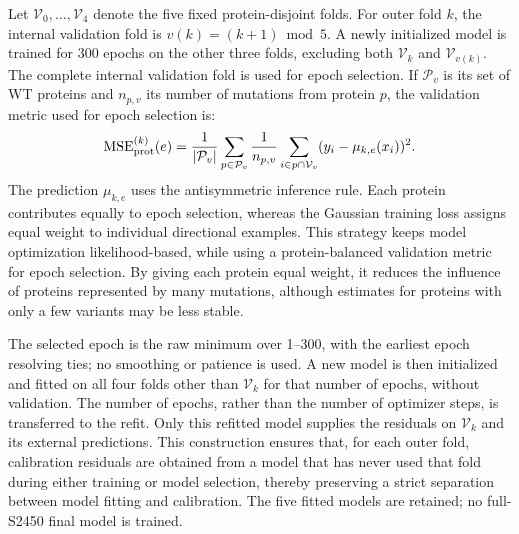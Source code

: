 \documentclass[11pt]{article}
\begin{document}
Let $\mathcal V_0,\ldots,\mathcal V_4$ denote the five fixed protein-disjoint folds.
For outer fold $k$, the internal validation fold is \begin{math}
    v(k)=(k+1)\bmod 5
\end{math}.
A newly initialized model is trained for 300 epochs on the other three folds, excluding both
$\mathcal V_k$ and $\mathcal V_{v(k)}$. The complete internal validation fold is used
for epoch selection. If $\mathcal P_v$
is its set of WT proteins and $n_{p,v}$ its number of mutations from protein $p$, the validation metric used for epoch selection is:
\begin{equation}
\mathrm{MSE}_{\rm prot}^{(k)}(e)=\frac{1}{|\mathcal P_v|}
\sum_{p\in\mathcal P_v}\frac{1}{n_{p,v}}
\sum_{i\in p\cap\mathcal V_v}(y_i-\mu_{k,e}(x_i))^2.
\end{equation}
The prediction $\mu_{k,e}$ uses the antisymmetric inference rule. Each protein contributes
equally to epoch selection, whereas the Gaussian training loss assigns equal weight to
individual directional examples. This strategy keeps model optimization likelihood-based, while using a protein-balanced validation metric for epoch selection. By giving each protein equal weight, it reduces the influence of proteins represented by many mutations, although estimates for proteins with only a few variants may be less stable.

The selected epoch is the raw minimum over 1--300, with the earliest epoch resolving ties;
no smoothing or patience is used. A new model is then initialized and fitted on all four
folds other than $\mathcal V_k$ for that number of epochs, without validation.
The number of epochs, rather than the number of optimizer steps, is transferred to the refit.
Only this refitted model supplies the residuals on $\mathcal V_k$ and its external predictions.
This construction ensures that, for each outer fold, calibration residuals are obtained from a model that has never used that fold during either training or model selection, thereby preserving a strict separation between model fitting and calibration.
The five fitted models are retained; no full-S2450 final model is trained.

\end{document}
